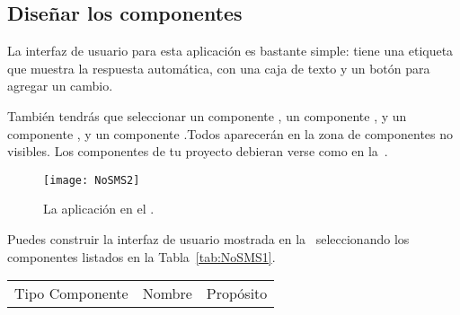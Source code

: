 {%






\subsection*{Diseñar los componentes}

La interfaz de usuario para esta aplicación es bastante simple: tiene
una etiqueta que muestra la respuesta automática, con una caja de
texto y un botón para agregar un cambio.

También tendrás que seleccionar un componente ,
un componente , y un componente
, y un componente
.Todos aparecerán en la zona de
componentes no visibles. Los componentes de tu proyecto debieran verse
como en la~.

\begin{figure}[H]
\vspace{3em}
\centering
\texttt{[image: NoSMS2]}
\caption{La aplicación  en el
  \componentDesigner.}
\label{fig:NoSMS2}
\end{figure}

Puedes construir la interfaz de usuario mostrada en
la~ seleccionando los componentes listados en
la Tabla~\ref{tab:NoSMS1}.

\begin{table}
\centering
\begin{footnotesize}
\begin{tabular}{|l|l|m{4cm}|}

\hline

Tipo Componente & Nombre & Propósito\\


\end{tabular}
\end{footnotesize}
\end{table}}
